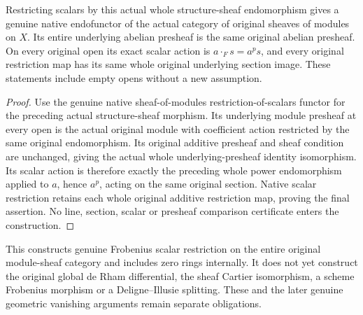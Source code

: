 \begin{theorem}
\label{thm:cartier-entire-scheme-frobenius-modules}
\leanok
Restricting scalars by this actual whole structure-sheaf endomorphism
gives a genuine native endofunctor of the actual category of original
sheaves of modules on $X$. Its entire underlying abelian presheaf is
the same original abelian presheaf. On every original open its exact
scalar action is $a\cdot_F s=a^p s$, and every original restriction
map has its same whole original underlying section image. These
statements include empty opens without a new assumption.
\end{theorem}
\begin{proof}
Use the genuine native sheaf-of-modules restriction-of-scalars
functor for the preceding actual structure-sheaf morphism. Its
underlying module presheaf at every open is the actual original
module with coefficient action restricted by the same original
endomorphism. Its original additive presheaf and sheaf condition
are unchanged, giving the actual whole underlying-presheaf identity
isomorphism. Its scalar action is therefore exactly the preceding
whole power endomorphism applied to $a$, hence $a^p$, acting on the
same original section. Native scalar restriction retains each whole
original additive restriction map, proving the final assertion.
No line, section, scalar or presheaf comparison certificate enters
the construction.
\end{proof}

This constructs genuine Frobenius scalar restriction on the entire
original module-sheaf category and includes zero rings internally.
It does not yet construct the original global de Rham differential,
the sheaf Cartier isomorphism, a scheme Frobenius morphism or a
Deligne--Illusie splitting. These and the later genuine geometric
vanishing arguments remain separate obligations.
